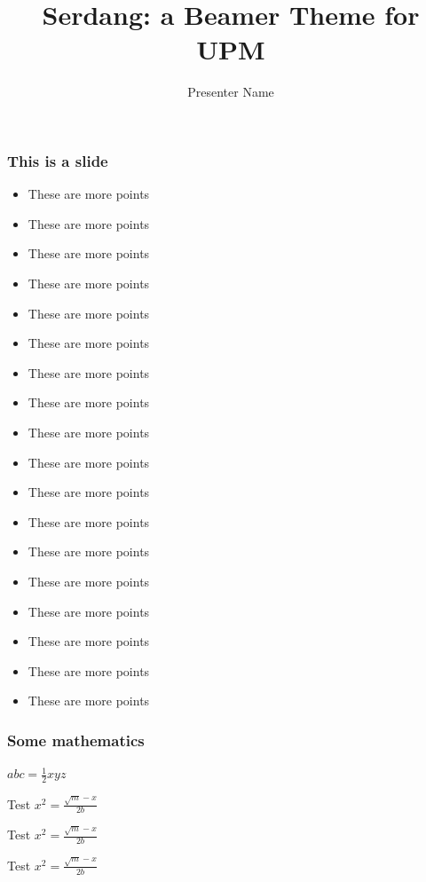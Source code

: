 \documentclass{beamer}
\title{Serdang: a Beamer Theme for UPM}
\author{Presenter Name}
\institute{Faculty of XYZ}
\date{}
\begin{document}
\begin{frame}[allowframebreaks]
\frametitle{This is a slide}
\begin{itemize}
\item These are more points
\item These are more points
\item These are more points
\item These are more points
\item These are more points
\item These are more points
\item These are more points
\item These are more points
\item These are more points
\item These are more points
\item These are more points
\item These are more points
\item These are more points
\item These are more points
\item These are more points
\item These are more points
\item These are more points
\item These are more points
\end{itemize}
\end{frame}

\begin{frame}
\frametitle{Some mathematics}

$abc = \frac{1}{2}xyz$

\begin{block}{Test}
$x^2 = \frac{\sqrt{m} - x}{2b}$
\end{block}

\begin{alertblock}{Test}
$x^2 = \frac{\sqrt{m} - x}{2b}$
\end{alertblock}

\begin{exampleblock}{Test}
$x^2 = \frac{\sqrt{m} - x}{2b}$
\end{exampleblock}

\end{frame}
\end{document}
